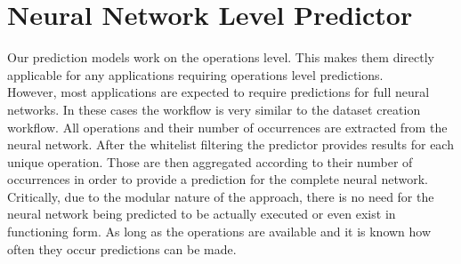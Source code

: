 \section{Neural Network Level Predictor}
Our prediction models work on the operations level. This makes them directly applicable for any applications requiring operations level predictions. \\
However, most applications are expected to require predictions for full neural networks. In these cases the workflow is very similar to the dataset creation workflow. All operations and their number of occurrences are extracted from the neural network. After the whitelist filtering the predictor provides results for each unique operation. Those are then aggregated according to their number of occurrences in order to provide a prediction for the complete neural network. \\
Critically, due to the modular nature of the approach, there is no need for the neural network being predicted to be actually executed or even exist in functioning form. As long as the operations are available and it is known how often they occur predictions can be made.




